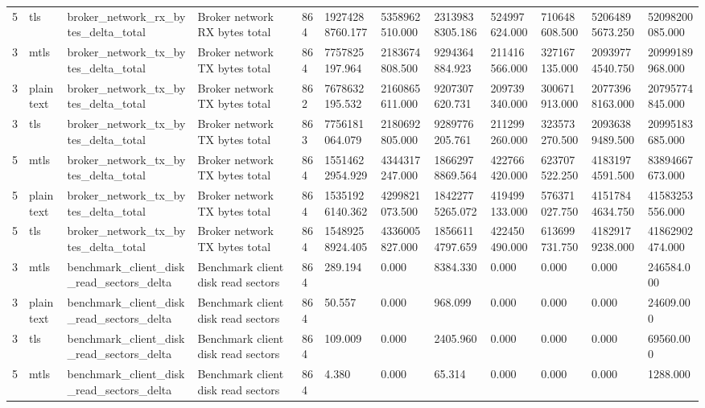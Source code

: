 \begin{longtable}{llllllllllll}
5 & tls & broker\_network\_rx\_bytes\_delta\_total & Broker network RX bytes total & 864 & 19274288760.177 & 5358962510.000 & 23139838305.186 & 524997624.000 & 710648608.500 & 52064895673.250 & 52098200085.000 \\
3 & mtls & broker\_network\_tx\_bytes\_delta\_total & Broker network TX bytes total & 864 & 7757825197.964 & 2183674808.500 & 9294364884.923 & 211416566.000 & 327167135.000 & 20939774540.750 & 20999189968.000 \\
3 & plaintext & broker\_network\_tx\_bytes\_delta\_total & Broker network TX bytes total & 862 & 7678632195.532 & 2160865611.000 & 9207307620.731 & 209739340.000 & 300671913.000 & 20773968163.000 & 20795774845.000 \\
3 & tls & broker\_network\_tx\_bytes\_delta\_total & Broker network TX bytes total & 863 & 7756181064.079 & 2180692805.000 & 9289776205.761 & 211299260.000 & 323573270.500 & 20936389489.500 & 20995183685.000 \\
5 & mtls & broker\_network\_tx\_bytes\_delta\_total & Broker network TX bytes total & 864 & 15514622954.929 & 4344317247.000 & 18662978869.564 & 422766420.000 & 623707522.250 & 41831974591.500 & 83894667673.000 \\
5 & plaintext & broker\_network\_tx\_bytes\_delta\_total & Broker network TX bytes total & 864 & 15351926140.362 & 4299821073.500 & 18422775265.072 & 419499133.000 & 576371027.750 & 41517844634.750 & 41583253556.000 \\
5 & tls & broker\_network\_tx\_bytes\_delta\_total & Broker network TX bytes total & 864 & 15489258924.405 & 4336005827.000 & 18566114797.659 & 422450490.000 & 613699731.750 & 41829179238.000 & 41862902474.000 \\
3 & mtls & benchmark\_client\_disk\_read\_sectors\_delta & Benchmark client disk read sectors & 864 & 289.194 & 0.000 & 8384.330 & 0.000 & 0.000 & 0.000 & 246584.000 \\
3 & plaintext & benchmark\_client\_disk\_read\_sectors\_delta & Benchmark client disk read sectors & 864 & 50.557 & 0.000 & 968.099 & 0.000 & 0.000 & 0.000 & 24609.000 \\
3 & tls & benchmark\_client\_disk\_read\_sectors\_delta & Benchmark client disk read sectors & 864 & 109.009 & 0.000 & 2405.960 & 0.000 & 0.000 & 0.000 & 69560.000 \\
5 & mtls & benchmark\_client\_disk\_read\_sectors\_delta & Benchmark client disk read sectors & 864 & 4.380 & 0.000 & 65.314 & 0.000 & 0.000 & 0.000 & 1288.000 \\

\end{longtable}
